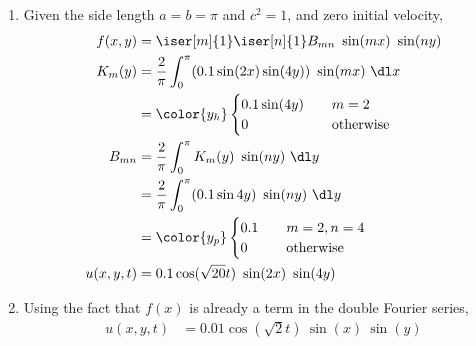 \begin{enumerate}
    \item Given the side length $ a = b = \pi $ and $ c^2 = 1 $, and zero initial
          velocity,
          \begin{align}
              f(x, y)    & = \iser[m]{1} \iser[n]{1} B_{mn}\ \sin(mx)
              \ \sin(ny)                                                          \\
              K_m(y)     & = \frac{2}{\pi} \int_{0}^{\pi} (0.1\sin(2x)\sin(4y))
              \ \sin(mx)\ \dl x                                                   \\
                         & = \color{y_h} \begin{cases}
                                             0.1\sin(4y) & \quad m = 2            \\
                                             0           & \quad \text{otherwise} \\
                                         \end{cases}     \\
              B_{mn}     & = \frac{2}{\pi} \int_{0}^{\pi} K_m(y)\ \sin(ny)\ \dl y \\
                         & = \frac{2}{\pi} \int_{0}^{\pi} (0.1\sin 4y)\ \sin(ny)
              \ \dl y                                                             \\
                         & = \color{y_p} \begin{cases}
                                             0.1 & \quad m = 2, n = 4     \\
                                             0   & \quad \text{otherwise} \\
                                         \end{cases}             \\
              u(x, y, t) & = 0.1 \cos(\sqrt{20}t)\ \sin(2x)\ \sin(4y)
          \end{align}

    \item Using the fact that $ f(x) $ is already a term in the double Fourier
          series,
          \begin{align}
              u(x, y, t) & = 0.01 \cos(\sqrt{2}t)\ \sin(x)\ \sin(y)
          \end{align}


\end{enumerate}
